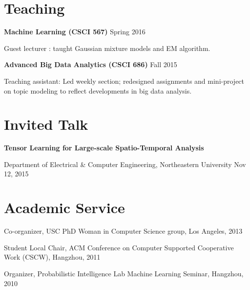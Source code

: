 \documentclass[margin,line]{res}
\begin{document}
\begin{resume}
\section{\sc Teaching }
 {\bf Machine Learning (CSCI 567)}   \hfill  { Spring 2016 } 
 
 \vspace{-.3cm}
 Guest  lecturer : taught Gaussian mixture models and EM algorithm.
 
 
 {\bf Advanced Big Data Analytics (CSCI 686)}   \hfill  {Fall 2015} 
 
 \vspace{-.3cm}
Teaching assistant: Led weekly section; redesigned assignments and mini-project on topic modeling to reflect developments in big data analysis. 


\section{\sc Invited Talk}
 {\bf Tensor Learning for Large-scale Spatio-Temporal Analysis} 
 
 \vspace{-.3cm}
Department of  Electrical \& Computer Engineering,  Northeastern University  \hfill {Nov 12, 2015}\\



\section{\sc Academic Service}

Co-organizer, USC PhD Woman in Computer Science group, Los Angeles, 2013

Student Local Chair, ACM Conference on Computer Supported Cooperative Work (CSCW), Hangzhou, 2011

Organizer, Probabilistic Intelligence Lab Machine Learning Seminar, Hangzhou, 2010


\end{resume}
\end{document}
